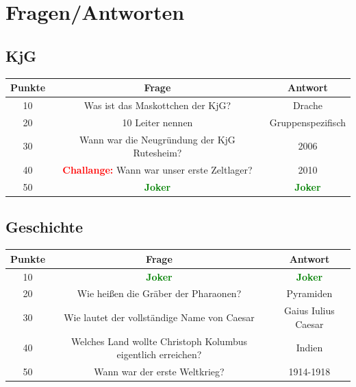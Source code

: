 \documentclass[11pt]{scrartcl}
\begin{document}
\newpage
\section*{Fragen/Antworten}
\subsection*{KjG}
\begin{table}[H]
    \begin{tabular}{|c|c|c|}\hline
        \textbf{Punkte}&\textbf{Frage}&\textbf{Antwort}\\\hline
        10&Was ist das Maskottchen der KjG?&Drache\\\hline
        20&10 Leiter nennen&Gruppenspezifisch\\\hline
        30&Wann war die Neugründung der KjG Rutesheim?&2006\\\hline
        40&\textcolor{red}{\textbf{Challange:}} Wann war unser erste Zeltlager? &2010\\\hline
        50&\textcolor{green}{\textbf{Joker}}&\textcolor{green}{\textbf{Joker}}\\\hline
    \end{tabular}
\end{table}
\subsection*{Geschichte}
\begin{table}[H]
    \begin{tabular}{|c|c|c|}\hline
        \textbf{Punkte}&\textbf{Frage}&\textbf{Antwort}\\\hline
        10&\textcolor{green}{\textbf{Joker}}&\textcolor{green}{\textbf{Joker}}\\\hline
        20&Wie heißen die Gräber der Pharaonen?&Pyramiden\\\hline
        30&Wie lautet der vollständige Name von Caesar&Gaius Iulius Caesar\\\hline
        40&Welches Land wollte Christoph Kolumbus eigentlich erreichen?&Indien\\\hline
        50&Wann war der erste Weltkrieg?&1914-1918\\\hline
    \end{tabular}
\end{table}
\end{document}
